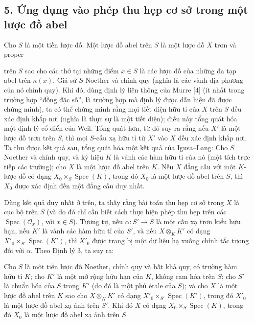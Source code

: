 \subsection*{5. Ứng dụng vào phép thu hẹp cơ sở trong một lược đồ abel}

Cho $S$ là một tiền lược đồ. Một lược đồ abel trên $S$ là một lược đồ $X$ trơn
và proper

trên $S$ sao cho các thớ tại những điểm $x\in S$ là các lược đồ của những đa
tạp abel trên $\kappa(x)$. Giả sử $S$ Noether và chính quy (nghĩa là các vành
địa phương của nó chính quy). Khi đó, dùng định lý liên thông của Murre [4]
(ít nhất trong trường hợp ``đồng đặc số'', là trường hợp mà định lý được dẫn
hiện đã được chứng minh), ta có thể chứng minh rằng mọi tiết diện hữu tỉ của
$X$ trên $S$ đều xác định khắp nơi (nghĩa là thực sự là một tiết diện); điều
này tổng quát hóa một định lý cổ điển của Weil. Tổng quát hơn, từ đó suy ra
rằng nếu $X'$ là một lược đồ trơn trên $S$, thì mọi $S$-cấu xạ hữu tỉ từ $X'$
vào $X$ đều xác định khắp nơi. Ta thu được kết quả sau, tổng quát hóa một kết
quả của Igusa--Lang: Cho $S$ Noether và chính quy, và ký hiệu $K$ là
vành các hàm hữu tỉ của nó (một tích trực tiếp các trường); cho $X$ là một lược
đồ abel trên $K$. Nếu $X$ đẳng cấu với một $K$-lược đồ có dạng
$X_0\times_S\operatorname{Spec}(K)$, trong đó $X_0$ là một lược đồ abel trên
$S$, thì $X_0$ được xác định đến một đẳng cấu duy nhất.

Dùng kết quả duy nhất ở trên, ta thấy rằng bài toán thu hẹp cơ sở trong $X$ là
cục bộ trên $S$ (và do đó chỉ cần biết cách thực hiện phép thu hẹp trên các
$\operatorname{Spec}(\mathcal O_x)$, với $x\in S$). Tương tự, nếu
$\alpha:S'\longrightarrow S$ là một cấu xạ trơn kiểu hữu hạn, nếu $K'$ là
vành các hàm hữu tỉ của $S'$, và nếu $X\otimes_KK'$ có dạng
$X'_0\times_{S'}\operatorname{Spec}(K')$, thì $X'_0$ được trang bị một dữ liệu
hạ xuống chính tắc tương đối với $\alpha$. Theo Định lý 3, ta suy ra:

 Cho $S$ là một tiền lược đồ Noether, chính quy và bất khả
quy, có trường hàm hữu tỉ $K$; cho $K'$ là một mở rộng hữu hạn của $K$, không
ram hóa trên $S$; cho $S'$ là chuẩn hóa của $S$ trong $K'$ (do đó là một phủ
étale của $S$); và cho $X$ là một lược đồ abel trên $K$ sao cho
$X\otimes_KK'$ có dạng $X'_0\times_{S'}\operatorname{Spec}(K')$, trong đó
$X'_0$ là một lược đồ abel xạ ảnh trên $S'$. Khi đó $X$ có dạng
$X_0\times_S\operatorname{Spec}(K)$, trong đó $X_0$ là một lược đồ abel xạ ảnh
trên $S$.

